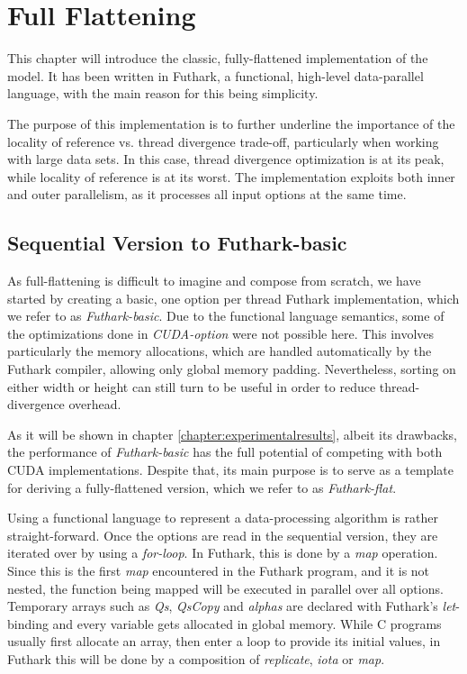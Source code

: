 \chapter{Full Flattening}
\label{chapter:fullflattening}
This chapter will introduce the classic, fully-flattened implementation of the model. It has been written in Futhark, a functional, high-level data-parallel language, with the main reason for this being simplicity. 

The purpose of this implementation is to further underline the importance of the locality of reference vs. thread divergence trade-off, particularly when working with large data sets. In this case, thread divergence optimization is at its peak, while locality of reference is at its worst. The implementation exploits both inner and outer parallelism, as it processes all input options at the same time. 

\section{Sequential Version to Futhark-basic}
As full-flattening is difficult to imagine and compose from scratch, we have started by creating a basic, one option per thread Futhark implementation, which we refer to as \textit{Futhark-basic}. Due to the functional language semantics, some of the optimizations done in \textit{CUDA-option} were not possible here. This involves particularly the memory allocations, which are handled automatically by the Futhark compiler, allowing only global memory padding. Nevertheless, sorting on either width or height can still turn to be useful in order to reduce thread-divergence overhead. 

As it will be shown in chapter \ref{chapter:experimentalresults}, albeit its drawbacks, the performance of \textit{Futhark-basic} has the full potential of competing with both CUDA implementations. Despite that, its main purpose is to serve as a template for deriving a fully-flattened version, which we refer to as \textit{Futhark-flat}.

Using a functional language to represent a data-processing algorithm is rather straight-forward. Once the options are read in the sequential version, they are iterated over by using a \textit{for-loop}. In Futhark, this is done by a \textit{map} operation. Since this is the first \textit{map} encountered in the Futhark program, and it is not nested, the function being mapped will be executed in parallel over all options. Temporary arrays such as \textit{Qs}, \textit{QsCopy} and \textit{alphas} are declared with Futhark's \textit{let}-binding and every variable gets allocated in global memory. While C programs usually first allocate an array, then enter a loop to provide its initial values, in Futhark this will be done by a composition of \textit{replicate}, \textit{iota} or \textit{map}.

